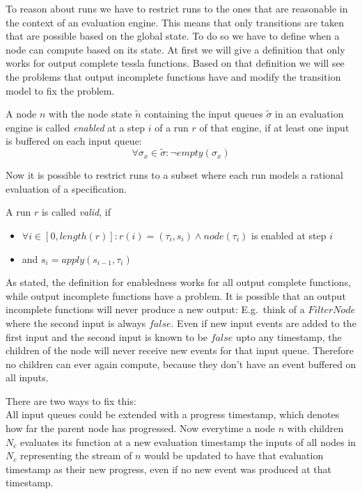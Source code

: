 To reason about runs we have to restrict runs to the ones that are reasonable in the context of an evaluation engine.
This means that only transitions are taken that are possible based on the global state.
To do so we have to define when a node can compute based on its state.
At first we will give a definition that only works for output complete \gls{tessla} functions.
Based on that definition we will see the problems that output incomplete functions have and modify the transition model to fix the problem.

\begin{definition}[name = Enabledness of a Node]\label{def:node_enabled}
  A node \(n\) with the node state \(\widetilde{n}\) containing the input queues \(\widetilde{\sigma}\) in an evaluation engine is called \emph{enabled} at a step \(i\) of a run \(r\) of that engine, if at least one input is buffered on each input queue:
  \[\forall \sigma_x \in \widetilde{\sigma}: \neg \mathit{empty}(\sigma_x)\]
\end{definition}

Now it is possible to restrict runs to a subset where each run models a rational evaluation of a specification.

\begin{definition}[name = Valid Run]\label{def:valid_run}
  A run \(r\) is called \emph{valid}, if
  \begin{itemize}
    \item \(\forall i \in [0,\mathit{length}(r)]: r(i) = (\tau_i,s_i) \land \mathit{node}(\tau_i)\) is enabled at step \(i\)
    \item and \(s_i = \mathit{apply}(s_{i-1}, \tau_i)\)
  \end{itemize}
\end{definition}

As stated, the definition for enabledness works for all output complete functions, while output incomplete functions have a problem.
It is possible that an output incomplete functions will never produce a new output:
E.g.\ think of a \(\mathit{FilterNode}\) where the second input is always \(\mathit{false}\).
Even if new input events are added to the first input and the second input is known to be \(\mathit{false}\) upto any timestamp, the children of the node will never receive new events for that input queue.
Therefore no children can ever again compute, because they don't have an event buffered on all inputs.

There are two ways to fix this:\\
All input queues could be extended with a progress timestamp, which denotes how far the parent node has progressed.
Now everytime a node \(n\) with children \(N_c\) evaluates its function at a new evaluation timestamp the inputs of all nodes in \(N_c\) representing the stream of \(n\) would be updated to have that evaluation timestamp as their new progress, even if no new event was produced at that timestamp.

